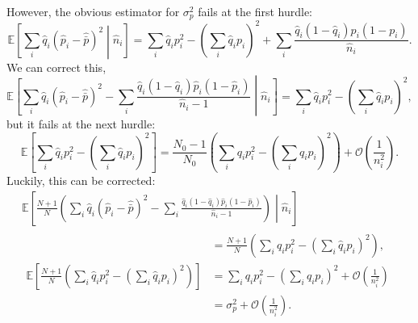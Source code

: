 \documentclass[12pt]{article}
\newcommand{\E}{\mathbb{E}}
\newcommand{\CO}{\mathcal{O}}
\newcommand{\prn}[1]{\left ( #1 \right )}
\newcommand{\brk}[1]{\left [ #1 \right ]}
\begin{document}
However, the obvious estimator for $\sigma_p^2$ fails at the first hurdle:
%
\begin{equation}\label{eq:sigest1}
  \E\brk{\sum_i\hat{q}_i(\hat{p}_i-\hat{\bar{p}})^2\middle|\hat{n}_i} = \sum_i \hat{q}_i p_i^2 - \prn{\sum_i \hat{q}_ip_i}^2 + \sum_i \frac{\hat{q}_i (1-\hat{q}_i)p_i(1-p_i)}{\hat{n}_i}.
\end{equation}
%
We can correct this,
%
\begin{equation}\label{eq:sigest2}
  \E\brk{\sum_i\hat{q}_i(\hat{p}_i-\hat{\bar{p}})^2 - \sum_i \frac{\hat{q}_i (1-\hat{q}_i)\hat{p}_i(1-\hat{p}_i)}{\hat{n}_i-1} \middle|\hat{n}_i} = \sum_i \hat{q}_i p_i^2 - \prn{\sum_i \hat{q}_ip_i}^2 ,
\end{equation}
%
but it fails at the next hurdle:
%
\begin{equation}\label{eq:sigest3}
  \E\brk{\sum_i \hat{q}_i p_i^2 - \prn{\sum_i \hat{q}_ip_i}^2 } = \frac{N_0-1}{N_0}\prn{\sum_i q_i p_i^2 - \prn{\sum_i q_ip_i}^2} + \CO\prn{\frac{1}{n_i^2}}.
\end{equation}
%
Luckily, this can be corrected:
%
\begin{equation}\label{eq:sigest4}
\begin{aligned}&
  \E\brk{\frac{N+1}{N}\prn{\sum_i\hat{q}_i(\hat{p}_i-\hat{\bar{p}})^2 - \sum_i \frac{\hat{q}_i (1-\hat{q}_i)\hat{p}_i(1-\hat{p}_i)}{\hat{n}_i-1} } \middle|\hat{n}_i} 
  \phantom{\sum_i q_i p_i^2 - \prn{\sum_i q_ip_i}} \\
&\begin{aligned}
  &= \frac{N+1}{N}\prn{\sum_i \hat{q}_i p_i^2 - \prn{\sum_i \hat{q}_ip_i}^2} ,\\
  \E\brk{\frac{N+1}{N}\prn{\sum_i \hat{q}_i p_i^2 - \prn{\sum_i \hat{q}_ip_i}^2} } &= \sum_i q_i p_i^2 - \prn{\sum_i q_ip_i}^2 + \CO\prn{\frac{1}{n_i^2}} \\&= \sigma_p^2 + \CO\prn{\frac{1}{n_i^2}}.
\end{aligned}
\end{aligned}
\end{equation}
%
\end{document}
